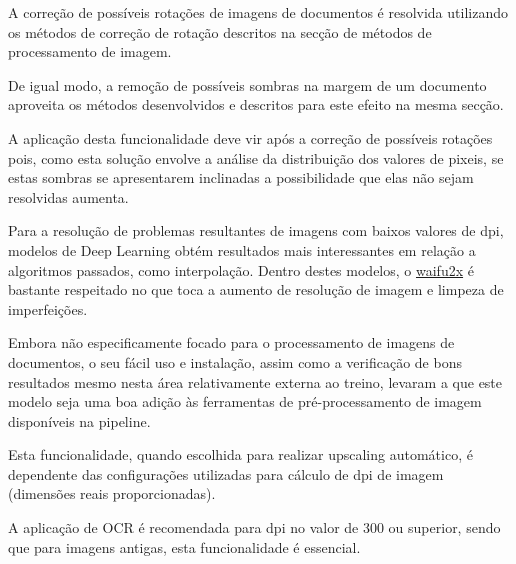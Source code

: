 
A correção de possíveis rotações de imagens de documentos é resolvida utilizando os métodos de correção de rotação descritos na secção de métodos de processamento de imagem.


De igual modo, a remoção de possíveis sombras na margem de um documento aproveita os métodos desenvolvidos e descritos para este efeito na mesma secção. 

A aplicação desta funcionalidade deve vir após a correção de possíveis rotações pois, como esta solução envolve a análise da distribuição dos valores de pixeis, se estas sombras se apresentarem inclinadas a possibilidade que elas não sejam resolvidas aumenta.



Para a resolução de problemas resultantes de imagens com baixos valores de dpi, modelos de Deep Learning obtém resultados mais interessantes em relação a algoritmos passados, como interpolação. Dentro destes modelos, o \href{https://github.com/nagadomi/waifu2x}{waifu2x} é bastante respeitado no que toca a aumento de resolução de imagem e limpeza de imperfeições. 

Embora não especificamente focado para o processamento de imagens de documentos, o seu fácil uso e instalação, assim como a verificação de bons resultados mesmo nesta área relativamente externa ao treino, levaram a que este modelo seja uma boa adição às ferramentas de pré-processamento de imagem disponíveis na pipeline.

Esta funcionalidade, quando escolhida para realizar upscaling automático, é dependente das configurações utilizadas para cálculo de dpi de imagem (dimensões reais proporcionadas).

A aplicação de OCR é recomendada para dpi no valor de 300 ou superior, sendo que para imagens antigas, esta funcionalidade é essencial.


